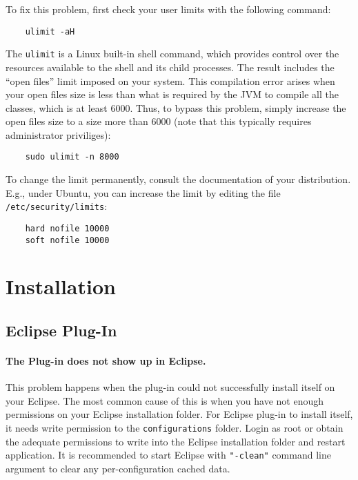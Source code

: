 \noindent To fix this problem, first check your user limits with the
following command:
\begin{verbatim}
    ulimit -aH
\end{verbatim}
The \texttt{ulimit} is a Linux built-in shell command, which provides
control over the resources available to the shell and its child
processes. The result includes the ``open files'' limit imposed on
your system. This compilation error arises when your open files
size is less than what is required by the JVM to compile all the
classes, which is at least 6000. Thus, to bypass this problem, simply
increase the open files size to a size more than 6000 (note that this
typically requires administrator priviliges):
\begin{verbatim}
    sudo ulimit -n 8000
\end{verbatim}
To change the limit permanently, consult the documentation of your
distribution. E.g., under Ubuntu, you can increase the limit by
editing the file \verb=/etc/security/limits=:
\begin{verbatim}
    hard nofile 10000
    soft nofile 10000
\end{verbatim}

\section{Installation}
\subsection{Eclipse Plug-In}
\paragraph{The Plug-in does not show up in Eclipse.} This problem happens when the plug-in could not successfully install itself on your Eclipse. The most common cause of this is when you have not enough permissions on your Eclipse installation folder. For Eclipse plug-in to install itself, it needs write permission to the \texttt{configurations} folder. Login as root or obtain the adequate permissions to write into the Eclipse installation folder and restart application.
It is recommended to start Eclipse with \texttt{"-clean"} command line argument to clear any per-configuration cached data.